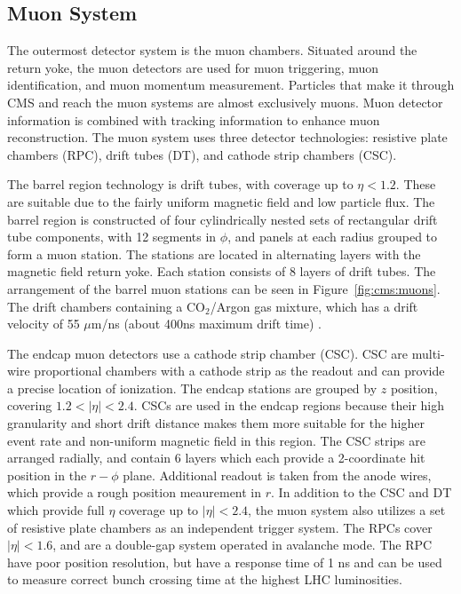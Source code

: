 \subsection{Muon System}\label{ch:cms:muons}
The outermost detector system is the muon chambers. Situated around the return yoke, the muon detectors are used for muon triggering, muon identification, and muon momentum measurement. Particles that make it through CMS and reach the muon systems are almost exclusively muons. Muon detector information is combined with tracking information to enhance muon reconstruction.
The muon system uses three detector technologies: resistive plate chambers (RPC), drift tubes (DT), and cathode strip chambers (CSC)\cite{CMS:1997iti}. 

The barrel region technology is drift tubes, with coverage up to $\eta < 1.2$. These are suitable due to the fairly uniform magnetic field and low particle flux. The barrel region is constructed of four cylindrically nested sets of rectangular drift tube components, with 12 segments in $\phi$, and panels at each radius grouped to form a muon station. The stations are located in alternating layers with the magnetic field return yoke. Each station consists of 8 layers of drift tubes. The arrangement of the barrel muon stations can be seen in Figure~\ref{fig:cms:muons}. The drift chambers containing a $\mathrm{CO_2}$/Argon gas mixture, which has a drift velocity of 55 $\mu$m/ns (about 400ns maximum drift time) \cite{Chatrchyan:2013sba}.



The endcap muon detectors use a cathode strip chamber (CSC). CSC are multi-wire proportional chambers with a cathode strip as the readout and can provide a precise location of ionization. The endcap stations are grouped by $z$ position, covering $1.2 < |\eta| < 2.4$. CSCs are used in the endcap regions because their high granularity and short drift distance makes them more suitable for the higher event rate and non-uniform magnetic field in this region. The CSC strips are arranged radially, and contain 6 layers which each provide a 2-coordinate hit position in the $r-\phi$ plane. Additional readout is taken from the anode wires, which provide a rough position meaurement in $r$.
In addition to the CSC and DT which provide full $\eta$ coverage up to $|\eta| < 2.4$, the muon system also utilizes a set of resistive plate chambers as an independent trigger system. The RPCs cover $|\eta| < 1.6$, and are a double-gap system operated in avalanche mode. The RPC have poor position resolution, but have a response time of 1 ns and can be used to measure correct bunch crossing time at the highest LHC luminosities. 
